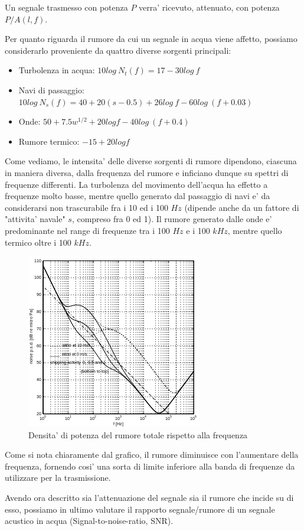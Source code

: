 Un segnale trasmesso con potenza $P$ verra' ricevuto, attenuato, con potenza $P/A(l, f)$.
\par
Per quanto riguarda il rumore da cui un segnale in acqua viene affetto, possiamo considerarlo proveniente da quattro diverse sorgenti principali:
\begin{itemize}
    \item Turbolenza in acqua: $10log\ N_t(f) = 17 - 30log\ f$
    \item Navi di passaggio: $10log\ N_s(f) = 40 + 20(s - 0.5) + 26log\ f - 60log\ (f+0.03)$
    \item Onde: $50 + 7.5w^{1/2}+ 20logf - 40log\ (f+0.4)$
    \item Rumore termico: $-15 + 20logf$
\end{itemize}
Come vediamo, le intensita' delle diverse sorgenti di rumore dipendono, ciascuna in maniera diversa, dalla frequenza del rumore e inficiano dunque su spettri di frequenze differenti. La turbolenza del movimento dell'acqua ha effetto a frequenze molto basse, mentre quello generato dal passaggio di navi e' da considerarsi non trascurabile fra i 10 ed i 100 $Hz$ (dipende anche da un fattore di "attivita' navale" $s$, compreso fra 0 ed 1). Il rumore generato dalle onde e' predominante nel range di frequenze tra i 100 $Hz$ e i 100 $kHz$, mentre quello termico oltre i 100 $kHz$.
\begin{figure}[H]
    \centering
    \includegraphics[]{noise.png}
    \caption{Densita' di potenza del rumore totale rispetto alla frequenza}
\end{figure}
Come si nota chiaramente dal grafico, il rumore diminuisce con l'aumentare della frequenza, fornendo cosi' una sorta di limite inferiore alla banda di frequenze da utilizzare per la trasmissione.
\par
Avendo ora descritto sia l'attenuazione del segnale sia il rumore che incide su di esso, possiamo in ultimo valutare il rapporto segnale/rumore di un segnale acustico in acqua (Signal-to-noise-ratio, SNR).
